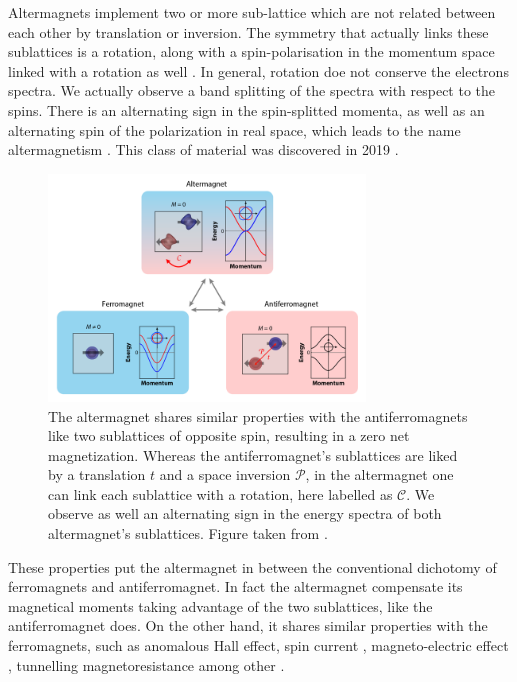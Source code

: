 \documentclass[../main.tex]{main.tex}
\begin{document}
Altermagnets implement two or more sub-lattice which are not related between each other by translation or inversion.
The symmetry that actually links these sublattices is a rotation,
along with a spin-polarisation in the momentum space linked with a rotation as well \cite{Smejkal2022}.
In general, rotation doe not conserve the electrons spectra. We actually observe a band splitting of the spectra with respect to the spins.
There is an alternating sign in the spin-splitted momenta, as well as an alternating spin of the polarization in real space,
which leads to the name altermagnetism \cite{Smejkal2022_2}. This class of material was discovered in 2019 \cite{Hayami2019}.
\begin{figure}[H]
    \centering
    \includegraphics[width = 0.75\textwidth]{Ressources/AM.png}
    \caption{The altermagnet shares similar properties with the antiferromagnets like two sublattices of opposite spin, resulting in a zero net
    magnetization. Whereas the antiferromagnet's sublattices are liked by a translation $t$ and a space inversion $\mathcal{P}$, in the altermagnet one can link
    each sublattice with a rotation, here labelled as $\mathcal{C}$. We observe as well an alternating sign in the energy spectra of both altermagnet's sublattices. 
    Figure taken from \cite{Smejkal2022}\cite{Stonebraker}.}
\end{figure}


These properties put the altermagnet in between
the conventional dichotomy of ferromagnets and antiferromagnet. In fact the altermagnet compensate its magnetical moments taking advantage of the two
sublattices, like the antiferromagnet does. On the other hand, it shares similar properties with the ferromagnets, such as anomalous Hall effect,
spin current \cite{Naka2021_2}, magneto-electric effect \cite{Smejkal2022_3}, tunnelling magnetoresistance \cite{Smejkal2022_4} among other \cite{Smejkal2022_2}.\\
\end{document}
